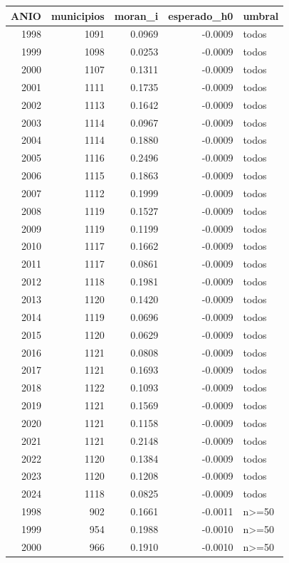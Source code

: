 \begin{tabular}{rrrrl}
\toprule
ANIO & municipios & moran\_i & esperado\_h0 & umbral \\
\midrule
1998 & 1091 & 0.0969 & -0.0009 & todos \\
1999 & 1098 & 0.0253 & -0.0009 & todos \\
2000 & 1107 & 0.1311 & -0.0009 & todos \\
2001 & 1111 & 0.1735 & -0.0009 & todos \\
2002 & 1113 & 0.1642 & -0.0009 & todos \\
2003 & 1114 & 0.0967 & -0.0009 & todos \\
2004 & 1114 & 0.1880 & -0.0009 & todos \\
2005 & 1116 & 0.2496 & -0.0009 & todos \\
2006 & 1115 & 0.1863 & -0.0009 & todos \\
2007 & 1112 & 0.1999 & -0.0009 & todos \\
2008 & 1119 & 0.1527 & -0.0009 & todos \\
2009 & 1119 & 0.1199 & -0.0009 & todos \\
2010 & 1117 & 0.1662 & -0.0009 & todos \\
2011 & 1117 & 0.0861 & -0.0009 & todos \\
2012 & 1118 & 0.1981 & -0.0009 & todos \\
2013 & 1120 & 0.1420 & -0.0009 & todos \\
2014 & 1119 & 0.0696 & -0.0009 & todos \\
2015 & 1120 & 0.0629 & -0.0009 & todos \\
2016 & 1121 & 0.0808 & -0.0009 & todos \\
2017 & 1121 & 0.1693 & -0.0009 & todos \\
2018 & 1122 & 0.1093 & -0.0009 & todos \\
2019 & 1121 & 0.1569 & -0.0009 & todos \\
2020 & 1121 & 0.1158 & -0.0009 & todos \\
2021 & 1121 & 0.2148 & -0.0009 & todos \\
2022 & 1120 & 0.1384 & -0.0009 & todos \\
2023 & 1120 & 0.1208 & -0.0009 & todos \\
2024 & 1118 & 0.0825 & -0.0009 & todos \\
1998 & 902 & 0.1661 & -0.0011 & n>=50 \\
1999 & 954 & 0.1988 & -0.0010 & n>=50 \\
2000 & 966 & 0.1910 & -0.0010 & n>=50 \\

\end{tabular}
